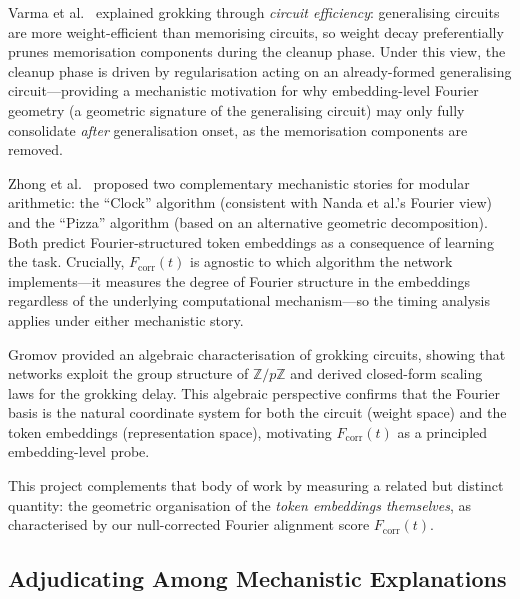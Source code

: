 \documentclass[12pt,openany,a4paper]{book}
\newcommand{\fcorr}{F_{\mathrm{corr}}}
\begin{document}
Varma et al.\ \cite{varma2023explaining} explained grokking through
\emph{circuit efficiency}: generalising circuits are more weight-efficient
than memorising circuits, so weight decay preferentially prunes
memorisation components during the cleanup phase.
Under this view, the cleanup phase is driven by regularisation acting
on an already-formed generalising circuit---providing a mechanistic
motivation for why embedding-level Fourier geometry (a geometric
signature of the generalising circuit) may only fully consolidate
\emph{after} generalisation onset, as the memorisation components
are removed.

Zhong et al.\ \cite{zhong2023clock} proposed two complementary
mechanistic stories for modular arithmetic: the ``Clock'' algorithm
(consistent with Nanda et al.'s Fourier view) and the ``Pizza''
algorithm (based on an alternative geometric decomposition).
Both predict Fourier-structured token embeddings as a consequence of
learning the task.
Crucially, $\fcorr(t)$ is agnostic to which algorithm the network
implements---it measures the degree of Fourier structure in the
embeddings regardless of the underlying computational mechanism---so
the timing analysis applies under either mechanistic story.

Gromov \cite{gromov2023grokking} provided an algebraic characterisation
of grokking circuits, showing that networks exploit the group structure
of $\mathbb{Z}/p\mathbb{Z}$ and derived closed-form scaling laws for
the grokking delay.
This algebraic perspective confirms that the Fourier basis is the
natural coordinate system for both the circuit (weight space) and
the token embeddings (representation space), motivating $\fcorr(t)$
as a principled embedding-level probe.

This project complements that body of work by measuring a
related but distinct quantity: the geometric organisation of the
\emph{token embeddings themselves}, as characterised by our
null-corrected Fourier alignment score $\fcorr(t)$.

\subsection{Adjudicating Among Mechanistic Explanations}
\label{sec:adjudicate}
\end{document}
